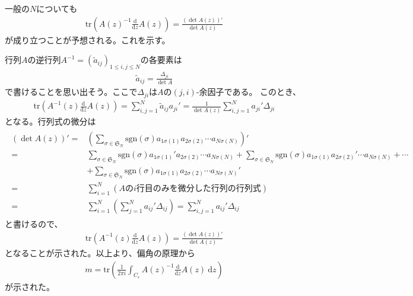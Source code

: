 \documentclass{jsarticle}
\def\diff{\textrm{d}}
\begin{document}
一般の$N$についても
\begin{align}
\mathrm{tr}\left(A(z)^{-1}\frac{\diff}{\diff z}A(z)\right)=\frac{\left(\det A(z)\right)'}{\det A(z)}
\end{align}
が成り立つことが予想される。これを示す。

行列$A$の逆行列$A^{-1}=(\tilde{a}_{ij})_{1\leq i,j\leq N}$の各要素は
\begin{align}
\tilde{a}_{ij}=\frac{\Delta_{ji}}{\det A}
\end{align}
で書けることを思い出そう。ここで$\Delta_{ji}$は$A$の$(j,i)$-余因子である。
このとき、
\begin{align}
\mathrm{tr}\left(A^{-1}(z)\frac{\diff}{\diff z}A(z)\right)
=\sum_{i,j=1}^{N}\tilde{a}_{ij}a_{ji}'
=\frac{1}{\det A(z)}\sum_{i,j=1}^{N}a_{ji}'\Delta_{ji}
\end{align}
となる。行列式の微分は
\begin{align*}
\begin{aligned}
    \left(\det A(z)\right)'=&\left(\sum_{\sigma\in\mathfrak{S}_{N}}\mathrm{sgn}(\sigma)a_{1\sigma(1)}a_{2\sigma(2)}\cdots a_{N\sigma(N)}\right)'\\
    =&\sum_{\sigma\in\mathfrak{S}_{N}}\mathrm{sgn}(\sigma)a_{1\sigma(1)}'a_{2\sigma(2)}\cdots a_{N\sigma(N)}
    +\sum_{\sigma\in\mathfrak{S}_{N}}\mathrm{sgn}(\sigma)a_{1\sigma(1)}a_{2\sigma(2)}'\cdots a_{N\sigma(N)}+\cdots\\
    &+\sum_{\sigma\in\mathfrak{S}_{N}}\mathrm{sgn}(\sigma)a_{1\sigma(1)}a_{2\sigma(2)}\cdots a_{N\sigma(N)}'\\
    =&\sum_{i=1}^{N}(A\mathrm{の}i\mathrm{行目のみを微分した行列の行列式})\\
    =&\sum_{i=1}^{N}\left(\sum_{j=1}^{N}a_{ij}'\Delta_{ij}\right)
    =\sum_{i,j=1}^{N}a_{ij}'\Delta_{ij}
\end{aligned}
\end{align*}
と書けるので、
\begin{align}
\mathrm{tr}\left(A^{-1}(z)\frac{\diff}{\diff z}A(z)\right)=\frac{\left(\det A(z)\right)'}{\det A(z)}
\end{align}
となることが示された。以上より、偏角の原理から
\begin{align}
    m=\mathrm{tr}\left(\frac{1}{2\pi i}\int_{C_{\varepsilon}}A(z)^{-1}\frac{\diff}{\diff z}A(z)~\diff z\right)
\end{align}
が示された。
\end{document}
